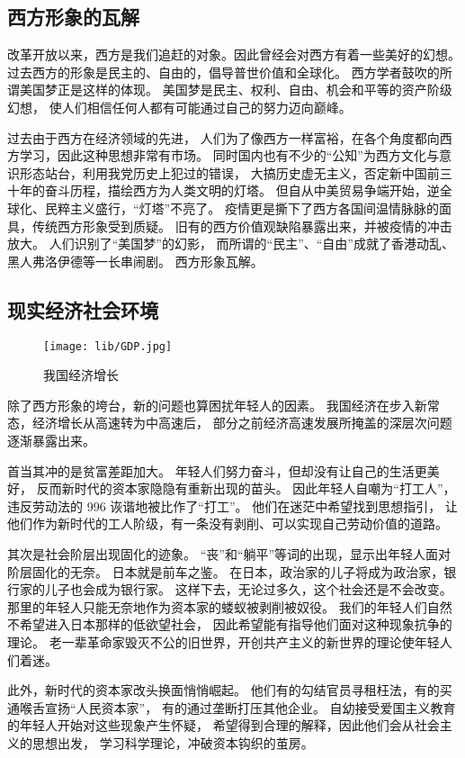 \documentclass{ctexart}
\begin{document}
\subsection{西方形象的瓦解}
改革开放以来，西方是我们追赶的对象。因此曾经会对西方有着一些美好的幻想。
过去西方的形象是民主的、自由的，倡导普世价值和全球化。
西方学者鼓吹的所谓美国梦正是这样的体现。
美国梦是民主、权利、自由、机会和平等的资产阶级幻想，
使人们相信任何人都有可能通过自己的努力迈向巅峰。

过去由于西方在经济领域的先进，
人们为了像西方一样富裕，在各个角度都向西方学习，因此这种思想非常有市场。
同时国内也有不少的“公知”为西方文化与意识形态站台，利用我党历史上犯过的错误，
大搞历史虚无主义，否定新中国前三十年的奋斗历程，描绘西方为人类文明的灯塔。
但自从中美贸易争端开始，逆全球化、民粹主义盛行，“灯塔”不亮了。
疫情更是撕下了西方各国间温情脉脉的面具，传统西方形象受到质疑。
旧有的西方价值观缺陷暴露出来，并被疫情的冲击放大。
人们识别了“美国梦”的幻影，
而所谓的“民主”、“自由”成就了香港动乱、黑人弗洛伊德等一长串闹剧。
西方形象瓦解。

\subsection{现实经济社会环境}

\begin{figure}
	\texttt{[image: lib/GDP.jpg]}
	\caption[Caption for LOF]{我国经济增长}
	\label{fig:GDP}
\end{figure}

除了西方形象的垮台，新的问题也算困扰年轻人的因素。
我国经济在步入新常态，经济增长从高速转为中高速后，
部分之前经济高速发展所掩盖的深层次问题逐渐暴露出来。

首当其冲的是贫富差距加大。
年轻人们努力奋斗，但却没有让自己的生活更美好，
反而新时代的资本家隐隐有重新出现的苗头。
因此年轻人自嘲为“打工人”，违反劳动法的 996 诙谐地被比作了“打工”。
他们在迷茫中希望找到思想指引，
让他们作为新时代的工人阶级，有一条没有剥削、可以实现自己劳动价值的道路。

其次是社会阶层出现固化的迹象。
“丧”和“躺平”等词的出现，显示出年轻人面对阶层固化的无奈。
日本就是前车之鉴。
在日本，政治家的儿子将成为政治家，银行家的儿子也会成为银行家。
这样下去，无论过多久，这个社会还是不会改变。
那里的年轻人只能无奈地作为资本家的蝼蚁被剥削被奴役。
我们的年轻人们自然不希望进入日本那样的低欲望社会，
因此希望能有指导他们面对这种现象抗争的理论。
老一辈革命家毁灭不公的旧世界，开创共产主义的新世界的理论使年轻人们着迷。

此外，新时代的资本家改头换面悄悄崛起。
他们有的勾结官员寻租枉法，有的买通喉舌宣扬“人民资本家”，
有的通过垄断打压其他企业。
自幼接受爱国主义教育的年轻人开始对这些现象产生怀疑，
希望得到合理的解释，因此他们会从社会主义的思想出发，
学习科学理论，冲破资本钩织的茧房。
\end{document}
